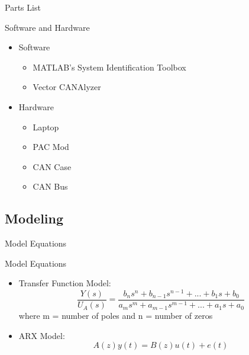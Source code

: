 \documentclass{beamer}
\begin{document}
\begin{frame}{Parts List}
  \begin{block}{Software and Hardware}
 \begin{itemize}
        \item Software
        \begin{itemize}
        \small
        \item MATLAB's System Identification Toolbox
        \item Vector CANAlyzer
        \end{itemize}
	\item Hardware
	\begin{itemize}
	\small
	\item Laptop
	\item PAC Mod
	\item CAN Case 
	\item CAN Bus
	\end{itemize}
\end{itemize}
  \end{block}
\end{frame}

\subsection{Modeling}

\begin{frame}{Model Equations}
	\begin{block}{Model Equations}
		\begin{itemize}
			\item Transfer Function Model: 
			\begin{equation}
				\frac{Y(s)}{U_A(s)} = \frac{b_{n}s^{n} + b_{n-1}s^{n-1} + ... + b_1s + b_0}{a_{m}s^{m} + a_{m-1}s^{m-1} + ... + a_1s + a_0}
			\end{equation}
			where m = number of poles and n = number of zeros
			\item ARX Model: 
			\begin{equation}
				A(z)y(t) = B(z)u(t) + e(t)
			\end{equation}
		\end{itemize}
	\end{block}
\end{frame}
\end{document}
